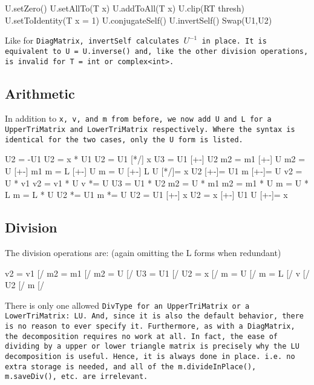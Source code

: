 \begin{tmvcode}
U.setZero()
U.setAllTo(T x)
U.addToAll(T x)
U.clip(RT thresh)
U.setToIdentity(T x = 1)
U.conjugateSelf()
U.invertSelf()
Swap(U1,U2)
\end{tmvcode}
Like for \tt{DiagMatrix}, \tt{invertSelf} calculates $U^{-1}$ in place.  
It is equivalent to \tt{U = U.inverse()} and, like the other division operations, is invalid for \tt{T = int} or \tt{complex<int>}.
\vspace{12pt}

\subsection{Arithmetic}
\label{TriMatrix_Arithmetic}

In addition to \tt{x}, \tt{v}, and \tt{m} from before, 
we now add \tt{U} and \tt{L} for a \tt{UpperTriMatrix}
and \tt{LowerTriMatrix} respectively.  Where the syntax is identical
for the two cases, only the \tt{U} form is listed.

\begin{tmvcode}
U2 = -U1
U2 = x * U1
U2 = U1 [*/] x
U3 = U1 [+-] U2
m2 = m1 [+-] U
m2 = U [+-] m1
m = L [+-] U
m = U [+-] L
U [*/]= x
U2 [+-]= U1
m [+-]= U
v2 = U * v1
v2 = v1 * U
v *= U
U3 = U1 * U2
m2 = U * m1
m2 = m1 * U
m = U * L
m = L * U
U2 *= U1
m *= U
U2 = U1 [+-] x
U2 = x [+-] U1
U [+-]= x
\end{tmvcode}

\subsection{Division}
\label{TriMatrix_Division}

The division operations are: (again omitting the L forms when redundant)
\begin{tmvcode}
v2 = v1 [/%
m2 = m1 [/%
m2 = U [/%
U3 = U1 [/%
U2 = x [/%
m = U [/%
m = L [/%
v [/%
U2 [/%
m [/%
\end{tmvcode}

There is only one allowed \tt{DivType} for an \tt{UpperTriMatrix} or a 
\tt{LowerTriMatrix}: \tt{LU}.
And, since it is also the default behavior,
there is no reason to ever specify it.
Furthermore, as with a \tt{DiagMatrix},
the decomposition requires no work at all.  In fact, the ease of dividing by a 
upper or lower triangle matrix is precisely why the LU decomposition is useful.
Hence, it is always done in place.  i.e. no extra storage is needed, and all of
the \tt{m.divideInPlace()}, \tt{m.saveDiv()}, etc. are irrelevant.

